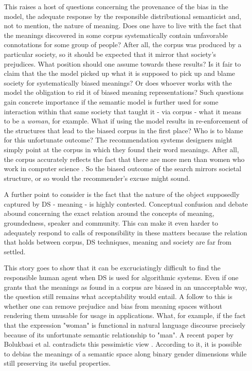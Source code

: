 \documentclass{article}
\begin{document}
This raises a host of questions concerning the provenance of the bias in the model, the adequate response by the responsible distributional semanticist and, not to mention, the nature of meaning.
Does one have to live with the fact that the meanings discovered in some corpus systematically contain unfavorable connotations for some group of people? After all, the corpus was produced by a particular society, so it should be expected that it mirror that society's prejudices. What position should one assume towards these results? Is it fair to claim that the the model picked up what it is supposed to pick up and blame society for systematically biased meanings? Or does whoever works with the model the obligation to rid it of biased meaning representations? Such questions gain concrete importance if the semantic model is further used for some interaction within that same society that taught it - via corpus - what it means to be a \emph{woman}, for example. 
What if using the model results in re-enforcement of the structures that lead to the biased corpus in the first place? 
Who is to blame for this unfortunate outcome? The recommendation systems designers might simply point at the corpus in which they found their word meanings. After all, the corpus accurately reflects the fact that there are more men than women who work in computer science \cite{womenincs}. So the biased outcome of the search mirrors societal structure, or so would the recommender's excuse might sound. 

A further point to consider is the fact that the nature of the object supposedly captured by DS - meaning - is highly contested. Conceptual confusion and debate abound concerning the exact relation around the concepts of meaning, groundedness, speaker and community. This can make it even harder to adequately respond to calls of responsibility in these matters because the relation that holds between corpus, DS techniques, meaning and society are far from settled. 

This story goes to show that it can be excruciatingly difficult to find the responsible human agent when DS is used for algorithmic systems. Even if one grants that the meanings as found in a corpus are biased in an unacceptable way, the question still remains what acceptability would entail. A follow to this is whether one can remove prejudice and bias from meaning spaces without rendering them unusable for usage in applications. What, for example, if the fact that the expression "woman" is functional in natural language discourse precisely because of its unfortunate semantic relationship to "man". A recent paper by Bolukbasi et al. contradicts this pessimistic view \cite{bolukbasi2016man}. According to it, it is possible to debias the meanings of a semantic space along binary gender dimensions while still preserving its useful properties.
\end{document}
